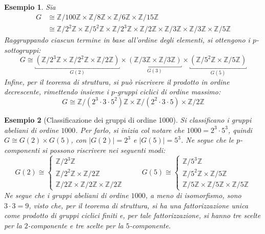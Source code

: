 \documentclass[11pt]{scrartcl}
\theoremstyle{style1}
\newtheorem{esempio}{Esempio}[section]
\numberwithin{equation}{subsection}
\begin{document}
\begin{esempio}
	Sia 
	\[
		\begin{split}
			G &\cong \mathbb{Z}/100\mathbb{Z} \times \mathbb{Z}/8\mathbb{Z} \times \mathbb{Z}/6\mathbb{Z} \times  \mathbb{Z}/15\mathbb{Z}\\
			  &\cong \mathbb{Z}/2^2\mathbb{Z} \times \mathbb{Z}/5^2\mathbb{Z}\times \mathbb{Z}/2^3 \mathbb{Z}\times \mathbb{Z}/2\mathbb{Z} \times \mathbb{Z}/3\mathbb{Z}\times \mathbb{Z}/3\mathbb{Z}\times \mathbb{Z}/5\mathbb{Z}
		\end{split}
	\] 
	Raggruppando ciascun termine in base all'ordine degli elementi, si ottengono i $p$-sottogruppi:
	\[
		G\cong \underbracket{\left(\mathbb{Z}/2^3 \mathbb{Z}\times \mathbb{Z}/2^2\mathbb{Z} \times \mathbb{Z}/2\mathbb{Z}\right)}_{G(2)}  \times \underbracket{\left(\mathbb{Z}/3\mathbb{Z} \times \mathbb{Z}/3\mathbb{Z}\right) }_{G(3)} \times \underbracket{\left(\mathbb{Z}/5^2 \mathbb{Z} \times \mathbb{Z}/5\mathbb{Z}\right) }_{G(5)} 
	\] 
	Infine, per il teorema di struttura, si pu\`o riscrivere il prodotto in ordine decrescente, rimettendo insieme i $p$-gruppi ciclici di ordine massimo:
	\[
	G\cong \mathbb{Z}/\left(2^3 \cdot 3\cdot 5^{2}\right) \mathbb{Z} \times \mathbb{Z}/\left(2^2 \cdot 3\cdot 5\right) \times \mathbb{Z}/2\mathbb{Z}
	\] 
\end{esempio}
\begin{esempio}
	[Classificazione dei gruppi di ordine 1000]
Si classificano i gruppi abeliani di ordine $1000$.
Per farlo, si inizia col notare che $1000 = 2^3 \cdot 5^3$, quindi $G \cong G(2) \times G(5)$, con $\lvert G(2) \rvert = 2^3$ e $\lvert G(5) \rvert =5^3$.
Ne segue che le $p$-componenti si possono riscrivere nei seguenti modi:
\[
G(2) \cong \begin{cases}
	\mathbb{Z}/2^3\mathbb{Z}\\
	\mathbb{Z}/2^2 \mathbb{Z} \times \mathbb{Z}/2\mathbb{Z}\\
	\mathbb{Z}/2\mathbb{Z} \times \mathbb{Z}/2\mathbb{Z} \times \mathbb{Z}/2\mathbb{Z}
\end{cases}\hspace{1cm}G(5) \cong \begin{cases}
	\mathbb{Z}/5^3\mathbb{Z}\\
	\mathbb{Z}/5^2 \mathbb{Z} \times \mathbb{Z}/5\mathbb{Z}\\
	\mathbb{Z}/5\mathbb{Z} \times \mathbb{Z}/5\mathbb{Z} \times \mathbb{Z}/5\mathbb{Z}
\end{cases}
\] 
Ne segue che i gruppi abeliani di ordine $1000$, a meno di isomorfismo, sono $3\cdot 3 = 9$, visto che, per il teorema di struttura, si ha una fattorizzazione unica come prodotto di gruppi ciclici finiti e, per tale fattorizzazione, si hanno tre scelte per la $2$-componente e tre scelte per la $5$-componente.
\end{esempio}
\end{document}

